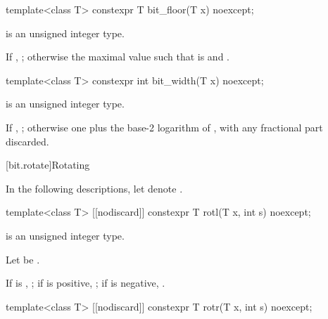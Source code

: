 %
\begin{itemdecl}
template<class T>
  constexpr T bit_floor(T x) noexcept;
\end{itemdecl}

\begin{itemdescr}
\pnum
\constraints
{} is an unsigned integer type.

\pnum
\returns
If , ;
otherwise the maximal value 
such that  is  and .

\end{itemdescr}

%
\begin{itemdecl}
template<class T>
  constexpr int bit_width(T x) noexcept;
\end{itemdecl}

\begin{itemdescr}
\pnum
\constraints
{} is an unsigned integer type.

\pnum
\returns
If , ;
otherwise one plus the base-2 logarithm of ,
with any fractional part discarded.

\end{itemdescr}

[bit.rotate]{Rotating}

\pnum
In the following descriptions,
let  denote .

\begin{itemdecl}
template<class T>
  [[nodiscard]] constexpr T rotl(T x, int s) noexcept;
\end{itemdecl}

%
\begin{itemdescr}
\pnum
\constraints
{} is an unsigned integer type.

\pnum
Let  be .

\pnum
\returns
If  is , ;
if  is positive, ;
if  is negative, .
\end{itemdescr}

\begin{itemdecl}
template<class T>
  [[nodiscard]] constexpr T rotr(T x, int s) noexcept;
\end{itemdecl}

